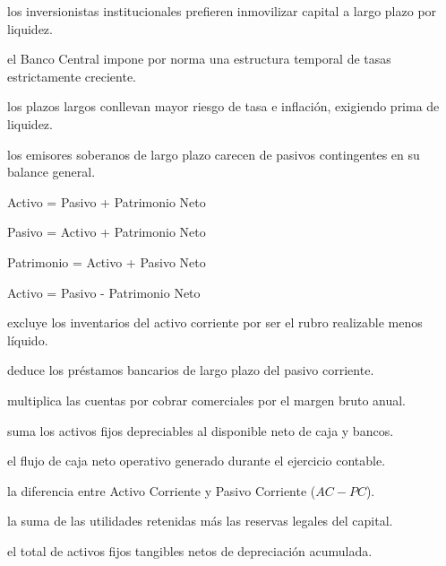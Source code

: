 \begin{opts}
    \item los inversionistas institucionales prefieren inmovilizar capital a largo plazo por liquidez.
    \item el Banco Central impone por norma una estructura temporal de tasas estrictamente creciente.
    \item los plazos largos conllevan mayor riesgo de tasa e inflación, exigiendo prima de liquidez.
    \item los emisores soberanos de largo plazo carecen de pasivos contingentes en su balance general.
\end{opts}

\begin{opts}
    \item Activo = Pasivo + Patrimonio Neto
    \item Pasivo = Activo + Patrimonio Neto
    \item Patrimonio = Activo + Pasivo Neto
    \item Activo = Pasivo - Patrimonio Neto
\end{opts}

\begin{opts}
    \item excluye los inventarios del activo corriente por ser el rubro realizable menos líquido.
    \item deduce los préstamos bancarios de largo plazo del pasivo corriente.
    \item multiplica las cuentas por cobrar comerciales por el margen bruto anual.
    \item suma los activos fijos depreciables al disponible neto de caja y bancos.
\end{opts}

\begin{opts}
    \item el flujo de caja neto operativo generado durante el ejercicio contable.
    \item la diferencia entre Activo Corriente y Pasivo Corriente ($AC - PC$).
    \item la suma de las utilidades retenidas más las reservas legales del capital.
    \item el total de activos fijos tangibles netos de depreciación acumulada.
\end{opts}

